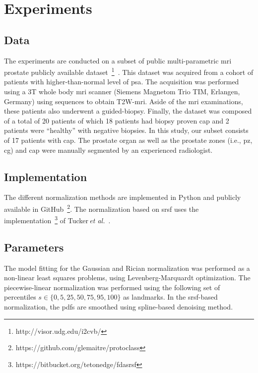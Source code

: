 \section{Experiments}
\label{sec:exp}

\subsection{Data}

The experiments are conducted on a subset of public multi-parametric \ac{mri} prostate publicly available dataset~\footnote{http://visor.udg.edu/i2cvb/}~\cite{lemaitre2015boosting}.
This dataset was acquired from a cohort of patients with higher-than-normal level of \ac{psa}. 
The acquisition was performed using a 3T whole body \ac{mri} scanner (Siemens Magnetom Trio TIM, Erlangen, Germany) using sequences to obtain T2W-\ac{mri}. 
Aside of the \ac{mri} examinations, these patients also underwent a guided-biopsy. 
Finally, the dataset was composed of a total of 20 patients of which 18 patients had biopsy proven \ac{cap} and 2 patients were ``healthy'' with negative biopsies. 
In this study, our subset consists of 17 patients with \ac{cap}. 
The prostate organ as well as the prostate zones (i.e., \ac{pz}, \ac{cg}) and \ac{cap} were manually segmented by an experienced radiologist.

\subsection{Implementation}

The different normalization methods are implemented in Python and publicly available in GitHub~\footnote{https://github.com/glemaitre/protoclass}.
The normalization based on \ac{srsf} uses the implementation~\footnote{https://bitbucket.org/tetonedge/fdasrsf} of Tucker\,\textit{et al.}~\cite{Tucker2013}.

\subsection{Parameters}

The model fitting for the Gaussian and Rician normalization was performed as a non-linear least squares problems, using Levenberg-Marquardt optimization.
The piecewise-linear normalization was performed using the following set of percentiles $s \in \{0, 5, 25, 50, 75, 95, 100 \}$ as landmarks.
In the \ac{srsf}-based normalization, the \acp{pdf} are smoothed using spline-based denoising method.
